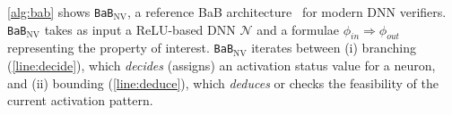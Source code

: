 \documentclass[oneside,11pt,dvipsnames]{book}
\newcommand{\nnproofformat}{\texttt{APTP}}
\newcommand{\bab}{\texttt{BaB$_{\text{NV}}$}}
\begin{document}
\autoref{alg:bab} shows \bab{}, a reference BaB architecture~\cite{nakagawa2014consolidating} for modern DNN verifiers. \bab{} takes as input a ReLU-based DNN $\mathcal{N}$ and a formulae $\phi_{in}\Rightarrow \phi_{out}$ representing the property of interest.
\bab{} iterates between (i) branching (\autoref{line:decide}), which \emph{decides} (assigns) an activation status value for a neuron, and (ii) bounding (\autoref{line:deduce}), which \emph{deduces} or checks the feasibility of the current activation pattern. 
\end{document}
